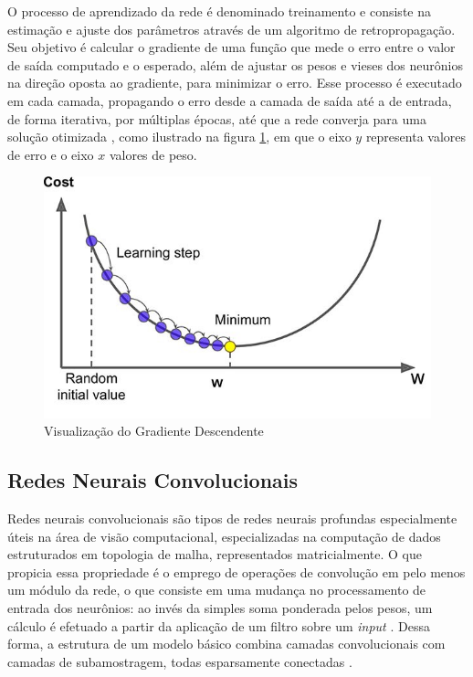 O processo de aprendizado da rede é denominado treinamento e consiste na estimação e ajuste dos parâmetros através de um algoritmo de retropropagação. Seu objetivo é calcular o gradiente de uma função que mede o erro entre o valor de saída computado e o esperado, além de ajustar os pesos e vieses dos neurônios na direção oposta ao gradiente, para minimizar o erro. Esse processo é executado em cada camada, propagando o erro desde a camada de saída até a de entrada, de forma iterativa, por múltiplas épocas, até que a rede converja para uma solução otimizada \cite{deeplearningbook}, como ilustrado na figura \ref{fig:gradientdescent}, em que o eixo $y$ representa valores de erro e o eixo $x$ valores de peso.

\begin{figure}[H]
	\caption{\label{fig:gradientdescent}Visualização do Gradiente Descendente}
    \begin{center}
    \includegraphics[width=1\linewidth]{images/gradientdescent.jpg}
	\end{center}
\end{figure}


\subsection{Redes Neurais Convolucionais}

Redes neurais convolucionais são tipos de redes neurais profundas especialmente úteis na área de visão computacional, especializadas na computação de dados estruturados em topologia de malha, representados matricialmente. O que propicia essa propriedade é o emprego de operações de convolução em pelo menos um módulo da rede, o que consiste em uma mudança no processamento de entrada dos neurônios: ao invés da simples soma ponderada pelos pesos, um cálculo é efetuado a partir da aplicação de um filtro sobre um \textit{input} \cite{deeplearningbook}. Dessa forma, a estrutura de um modelo básico combina camadas convolucionais com camadas de subamostragem, todas esparsamente conectadas \cite{reviewdeep}.

